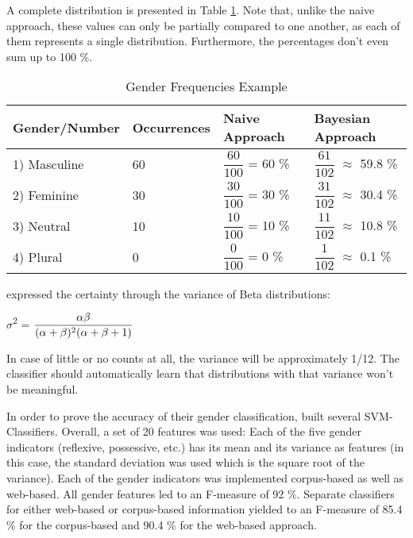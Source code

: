 A complete distribution is presented in Table \ref{table:bergsma2004GenderFreqTable}. Note that, unlike the naive approach, these values can only be partially compared to one another, as each of them represents a single distribution. Furthermore, the percentages don't even sum up to 100 \%.

\begin{table}[h]
    \renewcommand{\arraystretch}{2.0}
    \begin{tabular}{| l | l | l | l |}
    \hline
    Gender/Number & Occurrences & Naive Approach & Bayesian Approach \\ \hline
\hline
    1) Masculine & 60 & $\dfrac{60}{100}$ = 60 \% &  $\dfrac{61}{102}$ $\approx$ 59.8 \% \\ \hline
    2) Feminine & 30 &  $\dfrac{30}{100}$ = 30 \% &  $\dfrac{31}{102}$ $\approx$ 30.4 \% \\ \hline
    3) Neutral & 10 & $\dfrac{10}{100}$ = 10 \% & $\dfrac{11}{102}$ $\approx$ 10.8 \%  \\ \hline
    4) Plural & 0 &    $\dfrac{0}{100}$ =  0 \% &  $\dfrac{1}{102}$ $\approx$ 0.1 \% \\ \hline
    \end{tabular}
      \caption{Gender Frequencies Example}
     \label{table:bergsma2004GenderFreqTable}
\end{table}



 \cite{bergsma2005automatic} expressed the certainty through the variance of Beta distributions:

\begin{center}
	$\sigma$\textsuperscript{2} =  $\dfrac{\alpha \beta }{(\alpha + \beta)\textsuperscript{2}(\alpha + \beta + 1)}$
\end{center}

In case of little or no counts at all, the variance will be approximately 1/12. The classifier should automatically learn that distributions with that variance won't be meaningful.

In order to prove the accuracy of their gender classification, \cite{bergsma2005automatic} built several SVM-Classifiers. Overall, a set of 20 features was used: Each of the five gender indicators (reflexive, possessive, etc.) has its mean and its variance as features (in this case, the standard deviation was used which is the square root of the variance). Each of the gender indicators was implemented corpus-based as well as web-based. All gender features led to an F-measure of 92 \%. Separate classifiers for either web-based or corpus-based information yielded to an F-measure of 85.4 \% for the corpus-based and 90.4 \% for the web-based approach.

